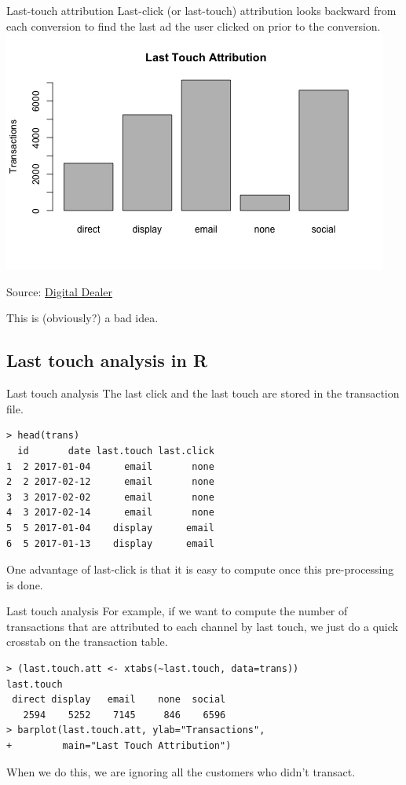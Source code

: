 \documentclass[10pt, aspectratio=169]{beamer}
\newcommand{\source}[1]{\begin{flushright} \footnotesize Source: {#1} \end{flushright} \normalsize}
\begin{document}
\begin{frame}{Last-touch attribution}
\alert{Last-click} (or \alert{last-touch}) attribution looks backward from each conversion to find the last ad the user clicked on prior to the conversion.\\
\bigskip
\centering
\includegraphics[height=0.5\textwidth]{images/lasttouch.png}\\
\source{\href{http://www.digitaldealer.com/marketing-attribution-finally-connects-dots/}{Digital Dealer}}
\bigskip \pause
\alert{This is (obviously?) a bad idea.}
\end{frame}
 
\subsection{Last touch analysis in R}

\begin{frame}[fragile]{Last touch analysis}
The last click and the last touch are stored in the transaction file.
\begin{lstlisting}
> head(trans)
  id       date last.touch last.click
1  2 2017-01-04      email       none
2  2 2017-02-12      email       none
3  3 2017-02-02      email       none
4  3 2017-02-14      email       none
5  5 2017-01-04    display      email
6  5 2017-01-13    display      email
\end{lstlisting}
One advantage of last-click is that it is easy to compute once this pre-processing is done. 
\end{frame}

\begin{frame}[fragile]{Last touch analysis}
For example, if we want to compute the number of transactions that are attributed to each channel by last touch, we just do a quick crosstab on the transaction table.   
\begin{lstlisting}
> (last.touch.att <- xtabs(~last.touch, data=trans))
last.touch
 direct display   email    none  social 
   2594    5252    7145     846    6596 
> barplot(last.touch.att, ylab="Transactions", 
+         main="Last Touch Attribution")
\end{lstlisting}
\alert{When we do this, we are ignoring all the customers who didn't transact.}
\end{frame}
\end{document}
